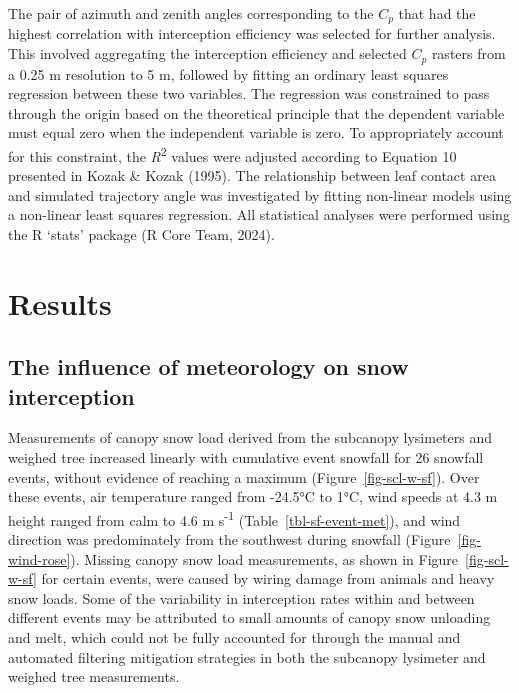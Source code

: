 \documentclass[
  letterpaper,
  DIV=11,
  numbers=noendperiod]{scrartcl}
\begin{document}
The pair of azimuth and zenith angles corresponding to the \(C_p\) that
had the highest correlation with interception efficiency was selected
for further analysis. This involved aggregating the interception
efficiency and selected \(C_p\) rasters from a 0.25 m resolution to 5 m,
followed by fitting an ordinary least squares regression between these
two variables. The regression was constrained to pass through the origin
based on the theoretical principle that the dependent variable must
equal zero when the independent variable is zero. To appropriately
account for this constraint, the \emph{R}\textsuperscript{2} values were
adjusted according to Equation 10 presented in Kozak \& Kozak (1995).
The relationship between leaf contact area and simulated trajectory
angle was investigated by fitting non-linear models using a non-linear
least squares regression. All statistical analyses were performed using
the R `stats' package (R Core Team, 2024).

\section{Results}\label{results}

\subsection{The influence of meteorology on snow
interception}\label{the-influence-of-meteorology-on-snow-interception}

Measurements of canopy snow load derived from the subcanopy lysimeters
and weighed tree increased linearly with cumulative event snowfall for
26 snowfall events, without evidence of reaching a maximum
(Figure~\ref{fig-scl-w-sf}). Over these events, air temperature ranged
from -24.5°C to 1°C, wind speeds at 4.3 m height ranged from calm to 4.6
m s\textsuperscript{-1} (Table~\ref{tbl-sf-event-met}), and wind
direction was predominately from the southwest during snowfall
(Figure~\ref{fig-wind-rose}). Missing canopy snow load measurements, as
shown in Figure~\ref{fig-scl-w-sf} for certain events, were caused by
wiring damage from animals and heavy snow loads. Some of the variability
in interception rates within and between different events may be
attributed to small amounts of canopy snow unloading and melt, which
could not be fully accounted for through the manual and automated
filtering mitigation strategies in both the subcanopy lysimeter and
weighed tree measurements.
\end{document}
